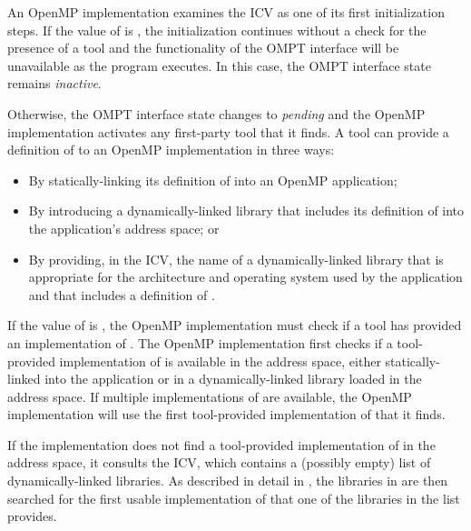 An OpenMP implementation examines the  ICV as one of its first 
initialization steps. If the value of  is , the 
initialization continues without a check for the presence of a tool and 
the functionality of the OMPT interface will be unavailable as the program 
executes. In this case, the OMPT interface state remains \emph{inactive}.

Otherwise, the OMPT interface state changes to \emph{pending} and the 
OpenMP implementation activates any first-party tool that it finds. A 
tool can provide a definition of  to an OpenMP 
implementation in three ways:

\begin{itemize}
\item By statically-linking its definition of  into an
      OpenMP application;
\item By introducing a dynamically-linked library that includes its definition
      of  into the application's address space; or
\item By providing, in the  ICV, the name of a 
      dynamically-linked library that is appropriate for the architecture and 
      operating system used by the application and that includes a
      definition of .
\end{itemize}

If the value of  is , the OpenMP implementation 
must check if a tool has provided an implementation of . 
The OpenMP implementation first checks if a tool-provided implementation of 
 is available in the address space, either 
statically-linked into the application or in a dynamically-linked library 
loaded in the address space. If multiple implementations of 
 are available, the OpenMP implementation will use 
the first tool-provided implementation of  that it finds.

If the implementation does not find a tool-provided implementation of 
 in the address space, it consults the 
 ICV, which contains a (possibly empty) list of 
dynamically-linked libraries. As  described in detail in 
, the libraries in  
are then searched for the first usable implementation of 
 that one of the libraries in the list provides.

